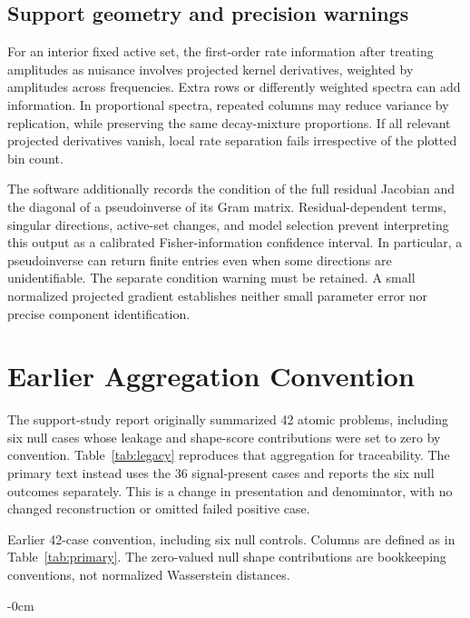 \subsection{Support geometry and precision warnings}
For an interior fixed active set, the first-order rate information after treating amplitudes as nuisance involves projected kernel derivatives, weighted by amplitudes across frequencies. Extra rows or differently weighted spectra can add information. In proportional spectra, repeated columns may reduce variance by replication, while preserving the same decay-mixture proportions. If all relevant projected derivatives vanish, local rate separation fails irrespective of the plotted bin count.

The software additionally records the condition of the full residual Jacobian and the diagonal of a pseudoinverse of its Gram matrix. Residual-dependent terms, singular directions, active-set changes, and model selection prevent interpreting this output as a calibrated Fisher-information confidence interval. In particular, a pseudoinverse can return finite entries even when some directions are unidentifiable. The separate condition warning must be retained. A small normalized projected gradient establishes neither small parameter error nor precise component identification.

\section{Earlier Aggregation Convention}\label{app:legacy}
The support-study report originally summarized 42 atomic problems, including six null cases whose leakage and shape-score contributions were set to zero by convention. Table~\ref{tab:legacy} reproduces that aggregation for traceability. The primary text instead uses the 36 signal-present cases and reports the six null outcomes separately. This is a change in presentation and denominator, with no changed reconstruction or omitted failed positive case.
\begin{table}[htbp]
\caption{Earlier 42-case convention, including six null controls. Columns are defined as in Table~\ref{tab:primary}. The zero-valued null shape contributions are bookkeeping conventions, not normalized Wasserstein distances.}\label{tab:legacy}
\begin{adjustwidth}{-\extralength}{0cm}\centering\small

\end{adjustwidth}
\end{table}


